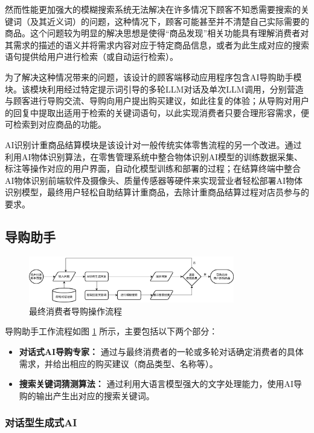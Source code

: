 然而性能更加强大的模糊搜索系统无法解决在许多情况下顾客不知悉需要搜索的关键词（及其近义词）的问题，这种情况下，顾客可能甚至并不清楚自己实际需要的商品。这个问题较为明显的解决思想是使得“商品发现”相关功能具有理解消费者对其需求的描述的语义并将需求内容对应于特定商品信息，或者为此生成对应的搜索语句提供给用户进行检索（或自动运行检索）。

为了解决这种情况带来的问题，该设计的顾客端移动应用程序包含AI导购助手模块。该模块利用经过特定提示词引导的多轮LLM对话及单次LLM调用，分别营造与顾客进行导购交流、导购向用户提出购买建议，如此往复的体验；从导购对用户的回复中提取出适用于检索的关键词语句，以此实现消费者只要合理形容需求，便可检索到对应商品的功能。

AI识别计重商品结算模块是该设计对一般传统实体零售流程的另一个改进。通过利用AI物体识别算法，在零售管理系统中整合物体识别AI模型的训练数据采集、标注等操作对应的用户界面，自动化模型训练和部署的过程；在结算终端中整合AI物体识别前端软件及摄像头、质量传感器等硬件来实现营业者轻松部署AI物体识别模型，最终用户轻松自助结算计重商品，去除计重商品结算过程对店员参与的要求。

\subsection{导购助手}

\begin{figure}[htbp]
	\centering
	\includegraphics[width=0.8\textwidth]{./imgs/ask-n-choose.png}
	\caption{最终消费者导购操作流程}
	\label{fig:ask-n-choose}
\end{figure}

导购助手工作流程如图 \ref{fig:ask-n-choose} 所示，主要包括以下两个部分：

\begin{itemize}
    \item \textbf{对话式AI导购专家：} 通过与最终消费者的一轮或多轮对话确定消费者的具体需求，并给出相应的购买建议（商品类型、名称等）。
    \item \textbf{搜索关键词猜测算法：} 通过利用大语言模型强大的文字处理能力，使用AI导购的输出产生出对应的搜索关键词。
\end{itemize}

\subsubsection{对话型生成式AI}

